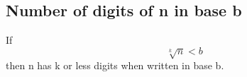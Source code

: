 \subsection{Number of digits of n in base b}
If
$$
\sqrt[k]{n} < b  
$$
then n has k or less digits when written in base b.
